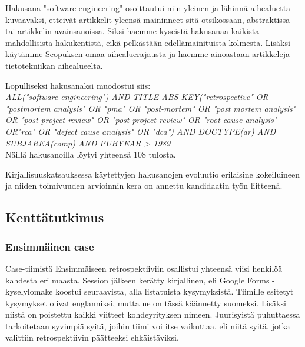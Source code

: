Hakusana "software engineering" osoittautui niin yleinen ja lähinnä aihealuetta kuvaavaksi, etteivät artikkelit yleensä maininneet sitä otsikossaan, abstraktissa tai artikkelin avainsanoissa. Siksi haemme kyseistä hakusanaa kaikista mahdollisista hakukentistä, eikä pelkästään edellämainituista kolmesta. Lisäksi käytämme Scopuksen omaa aihealuerajausta ja haemme ainoastaan artikkeleja tietotekniikan aihealueelta.

Lopulliseksi hakusanaksi muodostui siis:\\
\textit{ALL("software engineering") AND TITLE-ABS-KEY("retrospective" OR "postmortem analysis" OR "pma" OR "post-mortem" OR "post mortem analysis" OR "post-project review" OR "post project review" OR "root cause analysis" OR"rca" OR "defect cause analysis" OR "dca") AND DOCTYPE(ar) AND SUBJAREA(comp) AND PUBYEAR > 1989}\\
Näillä hakusanoilla löytyi yhteensä 108 tulosta.

Kirjallisuuskatsauksessa käytettyjen hakusanojen evoluutio erilaisine kokeiluineen ja niiden toimivuuden arvioinnin kera on annettu kandidaatin työn liitteenä.

\subsection{Kenttätutkimus}
\subsubsection{Ensimmäinen case}
Case-tiimistä Ensimmäiseen retrospektiiviin osallistui yhteensä viisi henkilöä kahdesta eri maasta.
Session jälkeen kerätty kirjallinen, eli Google Forms -kyselylomake koostui seuraavista, alla listatuista kysymyksistä. Tiimille esitetyt kysymykset olivat englanniksi, mutta ne on tässä käännetty suomeksi. Lisäksi niistä on poistettu kaikki viitteet kohdeyrityksen nimeen. Juurisyistä puhuttaessa tarkoitetaan syvimpiä syitä, joihin tiimi voi itse vaikuttaa, eli niitä syitä, jotka valittiin retrospektiivin päätteeksi ehkäistäviksi.

